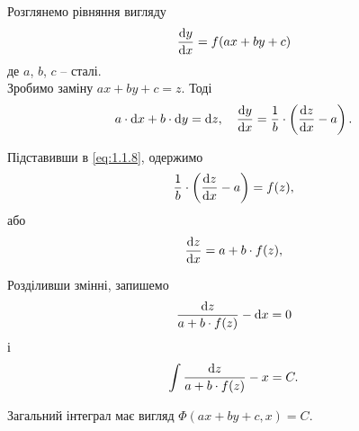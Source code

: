 Розглянемо рівняння вигляду
\begin{equation}
	\label{eq:1.1.8}
	\frac{\mathop{}\!\mathrm{d} y}{\mathop{}\!\mathrm{d} x} = f(a x + b y + c)
\end{equation}
де $a$, $b$, $c$ -- сталі. \\

Зробимо заміну $a x + b y + c = z$. Тоді 
\begin{equation}
	\label{eq:1.1.8_5}
	a \cdot \mathop{}\!\mathrm{d} x + b \cdot \mathop{}\!\mathrm{d} y = \mathop{}\!\mathrm{d} z, \quad \frac{\mathop{}\!\mathrm{d} y}{\mathop{}\!\mathrm{d} x} = \frac1b \cdot \left( \frac{\mathop{}\!\mathrm{d} z}{\mathop{}\!\mathrm{d} x} - a \right).
\end{equation}

Підставивши в \eqref{eq:1.1.8}, одержимо
\begin{equation}
	\label{eq:1.1.9}
	\frac1b \cdot \left( \frac{\mathop{}\!\mathrm{d} z}{\mathop{}\!\mathrm{d} x} - a \right) = f(z),
\end{equation}
або
\begin{equation}
	\label{eq:1.1.10}
	\frac{\mathop{}\!\mathrm{d} z}{\mathop{}\!\mathrm{d} x} = a + b \cdot f (z),
\end{equation}

Розділивши змінні, запишемо
\begin{equation}
	\label{eq:1.1.11}
	\frac{\mathop{}\!\mathrm{d} z}{a + b \cdot f (z)} - \mathop{}\!\mathrm{d} x = 0
\end{equation}
і
\begin{equation}
	\label{eq:1.1.12}
	\int \frac{\mathop{}\!\mathrm{d} z}{a + b \cdot f (z)} - x = C.
\end{equation}

Загальний інтеграл має вигляд $\Phi(a x + b y + c, x) = C$.